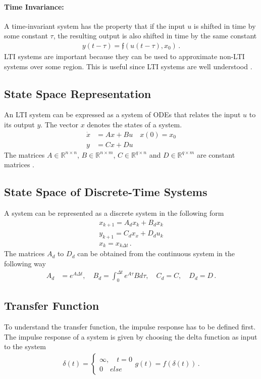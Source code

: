 \paragraph{Time Invariance:}
A time-invariant system has the property that if the input \(u\) is shifted in time by some constant \(\tau\), the resulting output is also shifted in time by the same constant
\begin{gather}
y(t - \tau) = \mathfrak{f}(u(t-\tau),  x_0) \,.
\end{gather}
LTI systems are important because they can be used to approximate non-LTI systems over some region.
This is useful since LTI systems are well understood \cite{DouglasB}.
\subsection{State Space Representation}
An LTI system can be expressed as a system of ODEs that relates the input \(u\) to its output \(y\).
The vector \(x\) denotes the states of a system.
\begin{align}
\dot{x} &= Ax + Bu \quad x(0) = x_0\\
y &= Cx + Du
\end{align}
The matrices \(A \in \mathbb{R}^{n \times n}\),
\(B \in \mathbb{R}^{n \times m}\),
\(C \in \mathbb{R}^{q \times n}\) and
\(D \in \mathbb{R}^{q \times m}\) are constant matrices \cite{BennerGrivet}.
\subsection{State Space of Discrete-Time Systems}
A system can be represented as a discrete system in the following form
\begin{gather}
x_{k+1} = A_dx_k + B_dx_k \label{disc-a} \\
y_{k+1} = C_dx_x + D_du_k \label{disc-b}\\
x_{k} = x_{k\Delta t} \,.
\end{gather}
The matrices \(A_d\) to \(D_d\) can be obtained from the continuous system in the following way \cite{brunton_kutz_2019g}
\begin{align}
A_d &= e^{A\Delta t}, \quad B_d = \int_0^{\Delta t} e^{A\tau}B d\tau,  \quad
C_d = C, \quad D_d = D \,.
\end{align}
\subsection{Transfer Function}
To understand the transfer function, the impulse response has to be defined first.
The impulse response of a system is given by choosing the delta function as input to the system
\begin{gather}
\delta(t) = \begin{cases}
\infty, \quad t = 0 \\
0 \quad else
\end{cases}
g(t) = f(\delta(t)) \,.
\end{gather}

